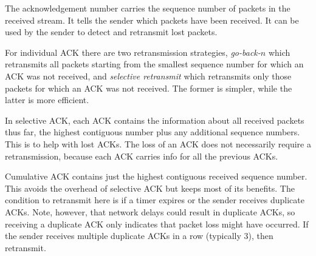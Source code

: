 The acknowledgement number carries the sequence number of packets
in the received stream. It tells the sender which packets have
been received. It can be used by the sender to detect and
retransmit lost packets.

For individual ACK there are two retransmission strategies, \emph{go-back-$n$}
which retransmits all packets starting from the smallest
sequence number for which an ACK was not received, and
\emph{selective retransmit} which retransmits only those
packets for which an ACK was not received. The former is
simpler, while the latter is more efficient.

In selective ACK, each ACK contains the information about all received packets
thus far, the highest contiguous number plus any additional
sequence numbers. This is to help with lost ACKs. The loss of
an ACK does not necessarily require a retransmission, because
each ACK carries info for all the previous ACKs.

Cumulative ACK contains just the highest contiguous received sequence
number. This avoids the overhead of selective ACK but keeps most
of its benefits. The condition to retransmit here is if a timer
expires or the sender receives duplicate ACKs. Note, however, that
network delays could result in duplicate ACKs, so receiving a duplicate
ACK only indicates that packet loss might have occurred. If the
sender receives multiple duplicate ACKs in a row (typically 3),
then retransmit.
